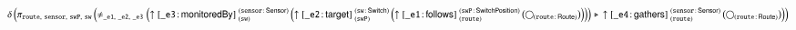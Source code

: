 \documentclass[varwidth=100cm,convert={density=120}]{standalone}
\begin{document}
\begin{preview}
$\duplicateelimination \left(\projection{\var{route},~\var{sensor},~\var{swP},~\var{sw}} \left(\alldifferent{\var{\_e1},~\var{\_e2},~\var{\_e3}} \left(\expandout{\_e3}{monitoredBy}{sw}{sensor}{Sensor} \left(\expandout{\_e2}{target}{swP}{sw}{Switch} \left(\expandout{\_e1}{follows}{route}{swP}{SwitchPosition} \left(\getvertices{route}{Route}\right)\right)\right)\right) \antijoin \expandout{\_e4}{gathers}{route}{sensor}{Sensor} \left(\getvertices{route}{Route}\right)\right)\right)$
\end{preview}
\end{document}
